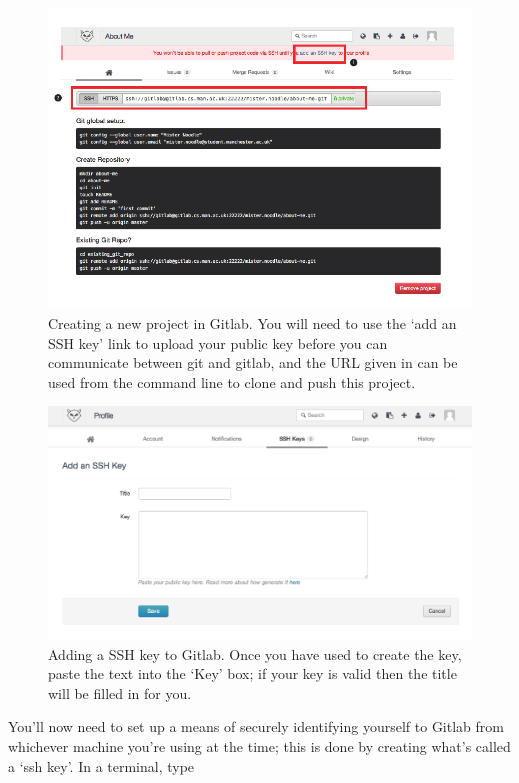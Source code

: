 \begin{figure}
\centerline{\includegraphics[width=15cm]{images/gitlab-new-project}}
\caption{Creating a new project in Gitlab. \protect{} You will need to use the  `add an SSH key' link to upload your public key before you can communicate between git and gitlab, and the URL given in \protect{} can be used from the command line to clone and push this project.}\label{figure:gitlab-new-project}
\end{figure}

\begin{figure}
\centerline{\includegraphics[width=13cm]{images/gitlab-ssh}}
\caption{Adding a SSH key to Gitlab. Once you have used  to create the key, paste the text into the `Key' box; if your key is valid then the title will be filled in for you.}\label{figure:gitlab-ssh}
\end{figure}


You'll now need to set up a means of securely identifying yourself to Gitlab from whichever machine you're using at the time; this is done by creating what's called a `ssh key'. In a terminal, type

